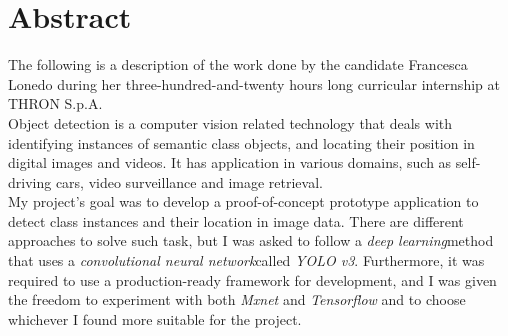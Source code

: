 
\cleardoublepage
{}
{}
\begingroup
\let\clearpage\relax
\let\cleardoublepage\relax
\let\cleardoublepage\relax

\chapter*{Abstract}
The following is a description of the work done by the candidate Francesca Lonedo during her three-hundred-and-twenty hours long curricular internship at THRON S.p.A. \\
Object detection is a computer vision related technology that deals with identifying instances of semantic class objects, and locating their position in digital images and videos. 
It has application in various domains, such as self-driving cars, video surveillance and image retrieval. \\
My project's goal was to develop a proof-of-concept prototype application to detect class instances and their location in image data. There are different approaches to solve such task, but I was asked to follow a \emph{\gls{deep learning}}\glsfirstoccur method that uses a \emph{\gls{convolutional neural network}}\glsfirstoccur called \emph{\gls{YOLO v3}}\glsfirstoccur. Furthermore, it was required to use a production-ready framework for development, and I was given the freedom to experiment with both \emph{Mxnet} and \emph{Tensorflow} and to choose whichever I found more suitable for the project. \\



%
%

\endgroup			

\vfill

